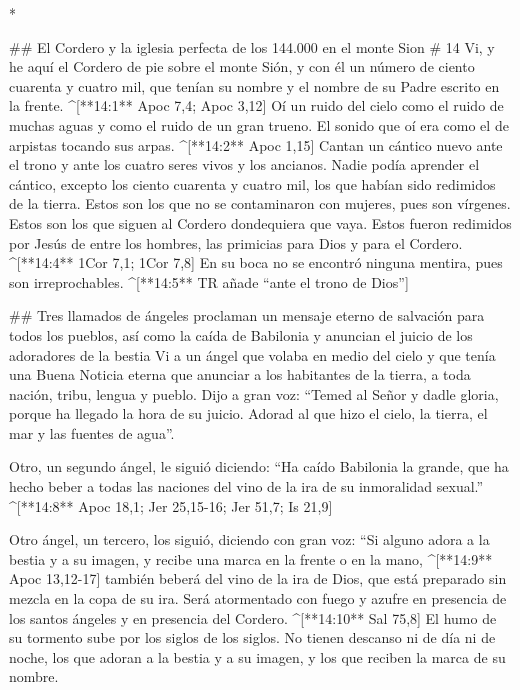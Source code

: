 \begin{paracols}{2}
\begin{english}
\end{english}
\switchcolumn[0]*

## El Cordero y la iglesia perfecta de los 144.000 en el monte Sion
# 14
 Vi, y he aquí el Cordero de pie sobre el monte Sión, y con él un número de ciento cuarenta y cuatro mil, que tenían su nombre y el nombre de su Padre escrito en la frente. ^[**14:1** Apoc 7,4; Apoc 3,12]  Oí un ruido del cielo como el ruido de muchas aguas y como el ruido de un gran trueno. El sonido que oí era como el de arpistas tocando sus arpas. ^[**14:2** Apoc 1,15]  Cantan un cántico nuevo ante el trono y ante los cuatro seres vivos y los ancianos. Nadie podía aprender el cántico, excepto los ciento cuarenta y cuatro mil, los que habían sido redimidos de la tierra.  Estos son los que no se contaminaron con mujeres, pues son vírgenes. Estos son los que siguen al Cordero dondequiera que vaya. Estos fueron redimidos por Jesús de entre los hombres, las primicias para Dios y para el Cordero. ^[**14:4** 1Cor 7,1; 1Cor 7,8]  En su boca no se encontró ninguna mentira, pues son irreprochables. ^[**14:5** TR añade “ante el trono de Dios”]

## Tres llamados de ángeles proclaman un mensaje eterno de salvación para todos los pueblos, así como la caída de Babilonia y anuncian el juicio de los adoradores de la bestia
 Vi a un ángel que volaba en medio del cielo y que tenía una Buena Noticia eterna que anunciar a los habitantes de la tierra, a toda nación, tribu, lengua y pueblo.  Dijo a gran voz: “Temed al Señor y dadle gloria, porque ha llegado la hora de su juicio. Adorad al que hizo el cielo, la tierra, el mar y las fuentes de agua”.

 Otro, un segundo ángel, le siguió diciendo: “Ha caído Babilonia la grande, que ha hecho beber a todas las naciones del vino de la ira de su inmoralidad sexual.” ^[**14:8** Apoc 18,1; Jer 25,15-16; Jer 51,7; Is 21,9]

 Otro ángel, un tercero, los siguió, diciendo con gran voz: “Si alguno adora a la bestia y a su imagen, y recibe una marca en la frente o en la mano, ^[**14:9** Apoc 13,12-17]  también beberá del vino de la ira de Dios, que está preparado sin mezcla en la copa de su ira. Será atormentado con fuego y azufre en presencia de los santos ángeles y en presencia del Cordero. ^[**14:10** Sal 75,8]  El humo de su tormento sube por los siglos de los siglos. No tienen descanso ni de día ni de noche, los que adoran a la bestia y a su imagen, y los que reciben la marca de su nombre.


\end{paracols}
